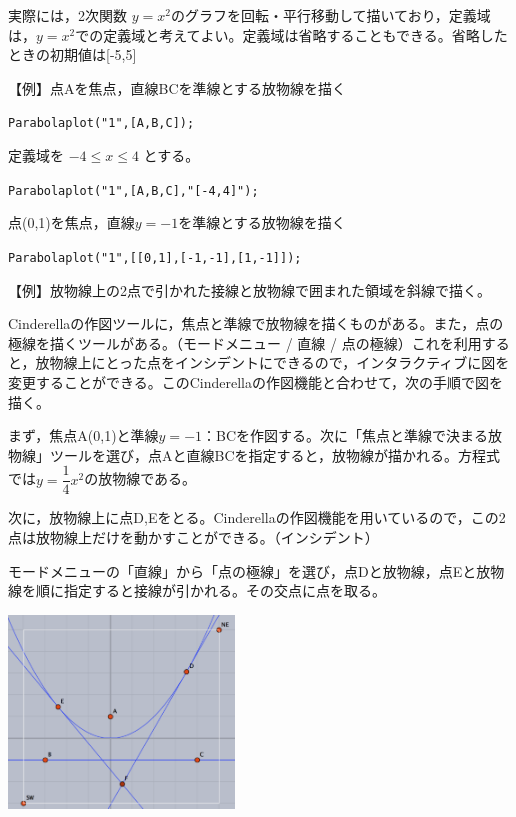\documentclass[papersize,a4paper,12pt,uplatex]{jsarticle}
\begin{document}
\begin{description}
  実際には，2次関数 $y=x^2$のグラフを回転・平行移動して描いており，定義域は，$y=x^2$での定義域と考えてよい。定義域は省略することもできる。省略したときの初期値は[-5,5]

\vspace{\baselineskip}
【例】点Aを焦点，直線BCを準線とする放物線を描く

\hspace{10mm}\verb|Parabolaplot("1",[A,B,C]); |
      
定義域を $-4 \leq x \leq 4$ とする。

\hspace{10mm} \verb|Parabolaplot("1",[A,B,C],"[-4,4]");|

点(0,1)を焦点，直線$y=-1$を準線とする放物線を描く

\hspace{10mm} \verb|Parabolaplot("1",[[0,1],[-1,-1],[1,-1]]);|

\vspace{\baselineskip}
【例】放物線上の2点で引かれた接線と放物線で囲まれた領域を斜線で描く。

Cinderellaの作図ツールに，焦点と準線で放物線を描くものがある。また，点の極線を描くツールがある。（モードメニュー / 直線 / 点の極線）これを利用すると，放物線上にとった点をインシデントにできるので，インタラクティブに図を変更することができる。このCinderellaの作図機能と合わせて，次の手順で図を描く。
  
まず，焦点A(0,1)と準線$y=-1$：BCを作図する。次に「焦点と準線で決まる放物線」ツールを選び，点Aと直線BCを指定すると，放物線が描かれる。方程式では$y=\dfrac{1}{4}x^2$の放物線である。

次に，放物線上に点D,Eをとる。Cinderellaの作図機能を用いているので，この2点は放物線上だけを動かすことができる。（インシデント）

モードメニューの「直線」から「点の極線」を選び，点Dと放物線，点Eと放物線を順に指定すると接線が引かれる。その交点に点を取る。

\vspace{\baselineskip}
\begin{center} \includegraphics[bb=0 0 482.02 413.02 , width=6cm]{Fig/parabolaplot.pdf} \end{center}
            

\end{description}
\end{document}
